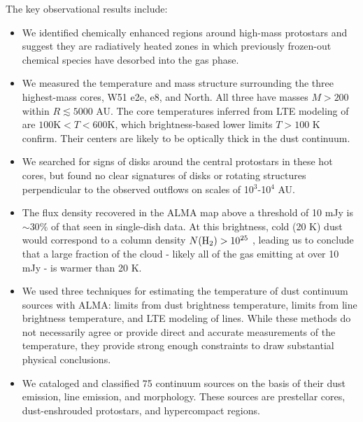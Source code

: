\documentclass{emulateapj}
\begin{document}
The key observational results include:
\begin{itemize}
    \item We identified chemically enhanced regions around high-mass protostars
        and suggest they are radiatively heated zones in which previously
        frozen-out chemical species have desorbed into the gas phase.
    \item We measured the temperature and mass structure surrounding the three
        highest-mass cores, W51 e2e, e8, and North.  All three have masses
        $M>200$ \msun within $R\lesssim5000$ AU.  The core temperatures
        inferred from LTE modeling of \methanol are $100 \mathrm{K} < T < 600
        \mathrm{K}$, which brightness-based lower limits $T>100$ K confirm.
        Their centers are likely to be optically thick in the dust continuum.
    \item We searched for signs of disks around the central protostars in these
        hot cores, but found no clear signatures of disks or rotating
        structures perpendicular to the observed outflows on scales of
        10$^3$-10$^4$ AU.
    \item The flux density recovered in the ALMA map above a threshold of 10
        mJy \perbeam is $\sim30\%$ of that seen in single-dish data.  At this
        brightness, cold (20 K) dust would correspond to a column density
        $N(\textrm{H}_{2})>10^{25}$ \persc, leading us to conclude that a large fraction
        of the cloud - likely all of the gas emitting at over 10 mJy \perbeam -
        is warmer than 20 K.
    \item We used three techniques for estimating the temperature of
        dust continuum sources with ALMA: limits from dust brightness
        temperature, limits from line brightness temperature, and LTE modeling
        of \methanol lines.  While these methods do not necessarily agree
        or provide direct and accurate measurements of the temperature, they
        provide strong enough constraints to draw substantial physical conclusions.
    \item We cataloged and classified 75 continuum sources on the basis of their
        dust emission, line emission, and morphology.  These sources are
        prestellar cores, dust-enshrouded protostars, and hypercompact \hii
        regions.
\end{itemize}
\end{document}

